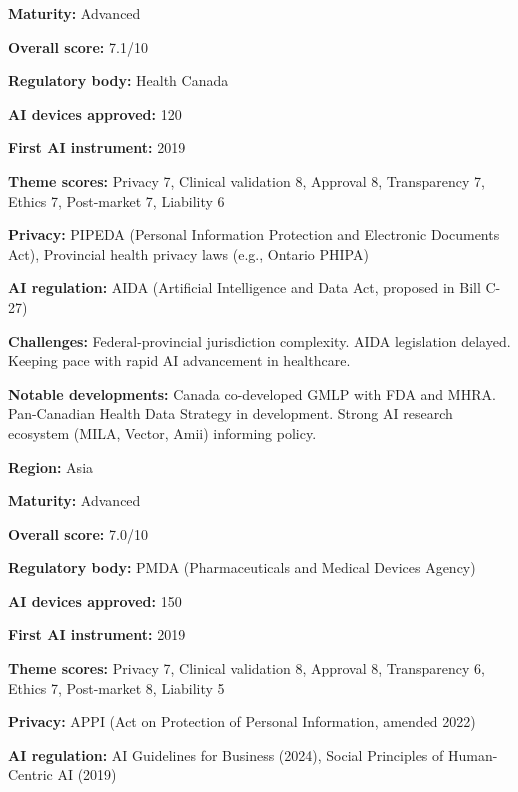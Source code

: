 \noindent\textbf{Maturity:} Advanced\par
\noindent\textbf{Overall score:} 7.1/10\par
\noindent\textbf{Regulatory body:} Health Canada\par
\noindent\textbf{AI devices approved:} 120\par
\noindent\textbf{First AI instrument:} 2019\par
\noindent\textbf{Theme scores:} Privacy 7, Clinical validation 8, Approval 8, Transparency 7, Ethics 7, Post-market 7, Liability 6\par
\noindent\textbf{Privacy:} PIPEDA (Personal Information Protection and Electronic Documents Act), Provincial health privacy laws (e.g., Ontario PHIPA)\par
\noindent\textbf{AI regulation:} AIDA (Artificial Intelligence and Data Act, proposed in Bill C-27)\par
\noindent\textbf{Challenges:} Federal-provincial jurisdiction complexity. AIDA legislation delayed. Keeping pace with rapid AI advancement in healthcare.\par
\noindent\textbf{Notable developments:} Canada co-developed GMLP with FDA and MHRA. Pan-Canadian Health Data Strategy in development. Strong AI research ecosystem (MILA, Vector, Amii) informing policy.\par
\vspace{0.55em}
\par
\vspace{0.15em}
\noindent\textbf{Region:} Asia\par
\noindent\textbf{Maturity:} Advanced\par
\noindent\textbf{Overall score:} 7.0/10\par
\noindent\textbf{Regulatory body:} PMDA (Pharmaceuticals and Medical Devices Agency)\par
\noindent\textbf{AI devices approved:} 150\par
\noindent\textbf{First AI instrument:} 2019\par
\noindent\textbf{Theme scores:} Privacy 7, Clinical validation 8, Approval 8, Transparency 6, Ethics 7, Post-market 8, Liability 5\par
\noindent\textbf{Privacy:} APPI (Act on Protection of Personal Information, amended 2022)\par
\noindent\textbf{AI regulation:} AI Guidelines for Business (2024), Social Principles of Human-Centric AI (2019)\par
